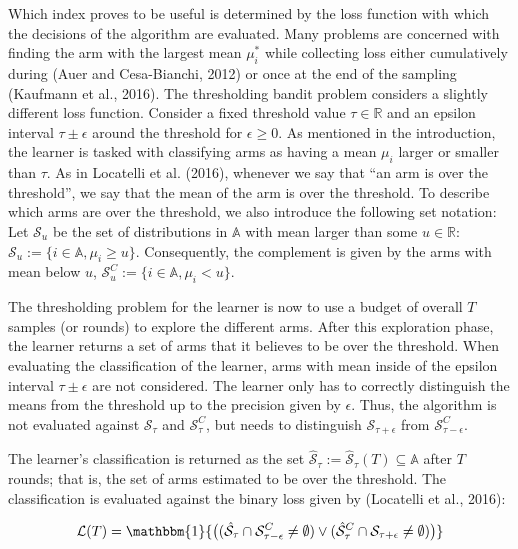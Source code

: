 \documentclass[11pt,]{article}
\begin{document}
Which index proves to be useful is determined by the loss function with
which the decisions of the algorithm are evaluated. Many problems are
concerned with finding the arm with the largest mean \(\mu_i^*\) while
collecting loss either cumulatively during (Auer and Cesa-Bianchi, 2012)
or once at the end of the sampling (Kaufmann et al., 2016). The
thresholding bandit problem considers a slightly different loss
function. Consider a fixed threshold value \(\tau \in \mathbb{R}\) and
an epsilon interval \(\tau \pm \epsilon\) around the threshold for
\(\epsilon \geq 0\). As mentioned in the introduction, the learner is
tasked with classifying arms as having a mean \(\mu_i\) larger or
smaller than \(\tau\). As in Locatelli et al. (2016), whenever we say
that ``an arm is over the threshold'', we say that the mean of the arm
is over the threshold. To describe which arms are over the threshold, we
also introduce the following set notation: Let \(\mathcal{S}_{u}\) be
the set of distributions in \(\mathbb{A}\) with mean larger than some
\(u \in \mathbb{R}\):
\(\mathcal{S}_{u} := \{i \in \mathbb{A}, \mu_i \geq u\}\). Consequently,
the complement is given by the arms with mean below \(u\),
\(\mathcal{S}^C_{u} := \{i \in \mathbb{A}, \mu_i < u\}\).

The thresholding problem for the learner is now to use a budget of
overall \(T\) samples (or rounds) to explore the different arms. After
this exploration phase, the learner returns a set of arms that it
believes to be over the threshold. When evaluating the classification of
the learner, arms with mean inside of the epsilon interval
\(\tau \pm \epsilon\) are not considered. The learner only has to
correctly distinguish the means from the threshold up to the precision
given by \(\epsilon\). Thus, the algorithm is not evaluated against
\(\mathcal{S}_{\tau}\) and \(\mathcal{S}^C_{\tau}\), but needs to
distinguish \(\mathcal{S}_{\tau+\epsilon}\) from
\(\mathcal{S}^C_{\tau-\epsilon}\).

The learner's classification is returned as the set
\(\hat{\mathcal{S}}_{\tau} := \hat{\mathcal{S}}_{\tau}(T) \subseteq \mathbb{A}\)
after \(T\) rounds; that is, the set of arms estimated to be over the
threshold. The classification is evaluated against the binary loss given
by (Locatelli et al., 2016):

\[
\mathcal{L}(T) = \mathbbm{1}{\big((\hat{\mathcal{S}}_{\tau} \cap \mathcal{S}_{\tau-\epsilon}^C \neq \emptyset) \lor (\hat{\mathcal{S}}_{\tau}^C \cap \mathcal{S}_{\tau+\epsilon} \neq \emptyset)\big)}
\]
\end{document}
